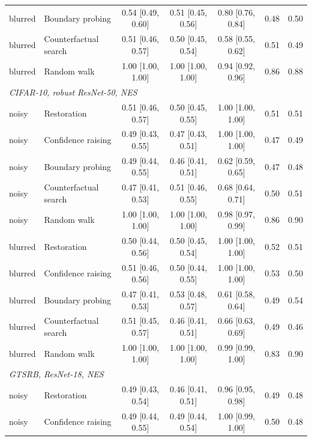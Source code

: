 \begin{landscape}
\begin{footnotesize}
\begin{longtable}{@{\extracolsep{\fill}}llccccc@{}}
\quad blurred & Boundary probing & 0.54 {[}0.49, 0.60{]} & 0.51 {[}0.45, 0.56{]} & 0.80 {[}0.76, 0.84{]} & 0.48 & 0.50 \\
\quad blurred & Counterfactual search & 0.51 {[}0.46, 0.57{]} & 0.50 {[}0.45, 0.54{]} & 0.58 {[}0.55, 0.62{]} & 0.51 & 0.49 \\
\quad blurred & Random walk & 1.00 {[}1.00, 1.00{]} & 1.00 {[}1.00, 1.00{]} & 0.94 {[}0.92, 0.96{]} & 0.86 & 0.88 \\
\multicolumn{7}{l}{\emph{CIFAR-10, robust ResNet-50, NES}} \\
\quad noisy & Restoration & 0.51 {[}0.46, 0.57{]} & 0.50 {[}0.45, 0.55{]} & 1.00 {[}1.00, 1.00{]} & 0.51 & 0.51 \\
\quad noisy & Confidence raising & 0.49 {[}0.43, 0.55{]} & 0.47 {[}0.43, 0.51{]} & 1.00 {[}1.00, 1.00{]} & 0.47 & 0.49 \\
\quad noisy & Boundary probing & 0.49 {[}0.44, 0.55{]} & 0.46 {[}0.41, 0.51{]} & 0.62 {[}0.59, 0.65{]} & 0.47 & 0.48 \\
\quad noisy & Counterfactual search & 0.47 {[}0.41, 0.53{]} & 0.51 {[}0.46, 0.55{]} & 0.68 {[}0.64, 0.71{]} & 0.50 & 0.51 \\
\quad noisy & Random walk & 1.00 {[}1.00, 1.00{]} & 1.00 {[}1.00, 1.00{]} & 0.98 {[}0.97, 0.99{]} & 0.86 & 0.90 \\
\quad blurred & Restoration & 0.50 {[}0.44, 0.56{]} & 0.50 {[}0.45, 0.54{]} & 1.00 {[}1.00, 1.00{]} & 0.52 & 0.51 \\
\quad blurred & Confidence raising & 0.51 {[}0.46, 0.56{]} & 0.50 {[}0.44, 0.55{]} & 1.00 {[}1.00, 1.00{]} & 0.53 & 0.50 \\
\quad blurred & Boundary probing & 0.47 {[}0.41, 0.53{]} & 0.53 {[}0.48, 0.57{]} & 0.61 {[}0.58, 0.64{]} & 0.49 & 0.54 \\
\quad blurred & Counterfactual search & 0.51 {[}0.45, 0.57{]} & 0.46 {[}0.41, 0.51{]} & 0.66 {[}0.63, 0.69{]} & 0.49 & 0.46 \\
\quad blurred & Random walk & 1.00 {[}1.00, 1.00{]} & 1.00 {[}1.00, 1.00{]} & 0.99 {[}0.99, 1.00{]} & 0.83 & 0.90 \\
\multicolumn{7}{l}{\emph{GTSRB, ResNet-18, NES}} \\
\quad noisy & Restoration & 0.49 {[}0.43, 0.54{]} & 0.46 {[}0.41, 0.51{]} & 0.96 {[}0.95, 0.98{]} & 0.49 & 0.48 \\
\quad noisy & Confidence raising & 0.49 {[}0.44, 0.55{]} & 0.49 {[}0.44, 0.54{]} & 1.00 {[}0.99, 1.00{]} & 0.50 & 0.48 \\

\end{longtable}
\end{footnotesize}
\end{landscape}
